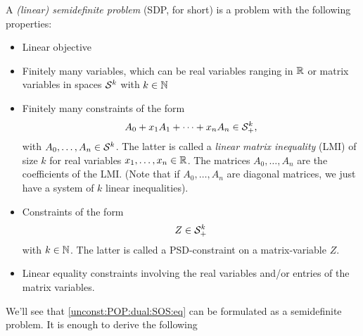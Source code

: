 A \emph{(linear) semidefinite problem} (SDP, for short) is a problem with the following properties:
\begin{itemize}
	\item Linear objective
	\item Finitely many variables, which can be real variables ranging in $\mathbb{R}$ or matrix variables in spaces $\mathcal{S}^k$ with $k \in \mathbb{N}$
	\item Finitely many constraints of the form
	\[
		A_0 + x_1 A_1 + \cdots + x_n A_n \in \mathcal{S}_+^k,
	\]
	with $A_0,\ldots,A_n \in \mathcal{S}^k$. The latter is called a \emph{linear matrix inequality} (LMI) of size $k$ for real variables $x_1,\ldots,x_n \in \mathbb{R}$. The matrices $A_0,\ldots,A_n$ are the coefficients of the LMI. (Note that if $A_0,\ldots,A_n$ are diagonal matrices, we just have a system of $k$ linear inequalities). 
	\item Constraints of the form
	\[
		Z \in \mathcal{S}_+^k
	\]
	with $k \in \mathbb{N}$. The latter is called a PSD-constraint on a matrix-variable $Z$. 
	\item Linear equality constraints involving the real variables and/or entries of the matrix variables.
\end{itemize}

We'll see that \eqref{unconst:POP:dual:SOS:eq} can be formulated as a semidefinite problem. It is enough to derive the following 

